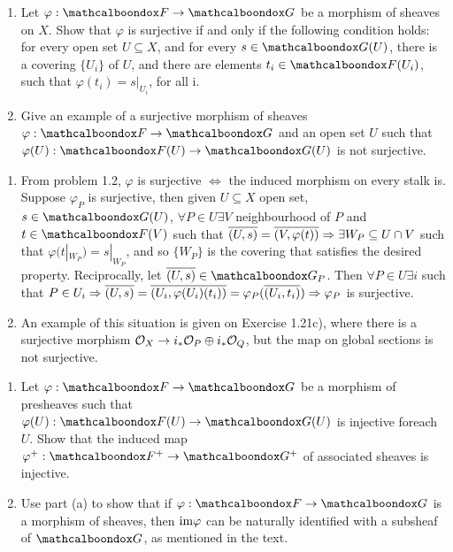\begin{ex}
	\begin{enumerate}[label=\alph*)]
		\item Let $\varphi: \sF \to \sG$ be a morphism of sheaves on $X$. Show that $\varphi$ is surjective if and only if the following condition holds: for every open set $U \subseteq X$, and for every $s \in \sG(U)$, there is a covering $\{U_i\}$ of $U$, and there are elements $t_i \in \sF(U_i)$, such that $\varphi(t_i) = s|_{U_i}$, for all i.

		\item Give an example of a surjective morphism of sheaves $\varphi: \sF \to \sG$ and an open set $U$ such that $\varphi(U): \sF(U) \to \sG(U)$ is not surjective.
	\end{enumerate}
\end{ex}

\begin{sol}
	\begin{enumerate}[label=\alph*)]
		\item From problem 1.2, $\varphi$ is surjective $\iff$ the induced morphism on every stalk is. Suppose $\varphi_P$ is surjective, then given $U \subseteq X$ open set, $s \in \sG(U)$, $\forall P \in U \exists V$ neighbourhood of $P$ and $t \in \sF(V)$ such that $\overline{(U,s)} = \overline{(V,\varphi(t))} \Rightarrow \exists W_P \subseteq U \cap V$ such that $\varphi(t|_{W_P}) = s|_{W_P}$, and so $\{W_P\}$ is the covering that satisfies the desired property. Reciprocally, let $\overline{(U,s)} \in \sG_P$. Then $\forall P \in U \exists i$ such that $P \in U_i \Rightarrow \overline{(U,s)} = \overline{(U_i, \varphi(U_i)(t_i))} = \varphi_P(\overline{(U_i, t_i)}) \Rightarrow \varphi_P$ is surjective.

		\item An example of this situation is given on Exercise 1.21c), where there is a surjective morphism $\mathcal{O}_X \to i_*\mathcal{O}_P \oplus i_* \mathcal{O}_Q$, but the map on global sections is not surjective.
	\end{enumerate}
\end{sol}

\begin{ex}
	\begin{enumerate}[label=\alph*)]
		\item Let $\varphi: \sF \to \sG$ be a morphism of presheaves such that $\varphi(U): \sF(U) \to \sG(U)$ is injective foreach $U$. Show that the induced map $\varphi^{+}: \sF^{+} \to \sG^{+}$ of associated sheaves is injective.

		\item Use part (a) to show that if $\varphi: \sF \to \sG$ is a morphism of sheaves, then $\mathrm{im} \varphi$ can be naturally identified with a subsheaf of $\sG$, as mentioned in the text.
	\end{enumerate}
\end{ex}

